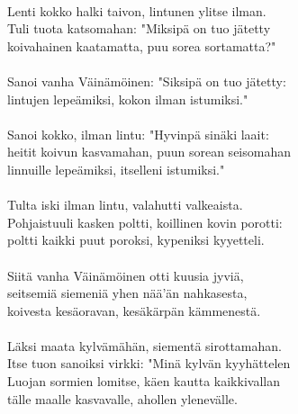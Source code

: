                                                                 \\
Lenti kokko halki taivon, lintunen ylitse ilman.                \\
Tuli tuota katsomahan: "Miksipä on tuo jätetty                  \\
koivahainen kaatamatta, puu sorea sortamatta?"                  \\
                                                                \\
Sanoi vanha Väinämöinen: "Siksipä on tuo jätetty:               \\
lintujen lepeämiksi, kokon ilman istumiksi."                    \\
                                                                \\
Sanoi kokko, ilman lintu: "Hyvinpä sinäki laait:                \\
heitit koivun kasvamahan, puun sorean seisomahan                \\
linnuille lepeämiksi, itselleni istumiksi."                     \\
                                                                \\
Tulta iski ilman lintu, valahutti valkeaista.                   \\
Pohjaistuuli kasken poltti, koillinen kovin porotti:            \\
poltti kaikki puut poroksi, kypeniksi kyyetteli.                \\
                                                                \\
Siitä vanha Väinämöinen otti kuusia jyviä,                      \\
seitsemiä siemeniä yhen nää'än nahkasesta,                      \\
koivesta kesäoravan, kesäkärpän kämmenestä.                     \\
                                                                \\
Läksi maata kylvämähän, siementä sirottamahan.                  \\
Itse tuon sanoiksi virkki: "Minä kylvän kyyhättelen             \\
Luojan sormien lomitse, käen kautta kaikkivallan                \\
tälle maalle kasvavalle, ahollen ylenevälle.                    \\
                                                                \\
